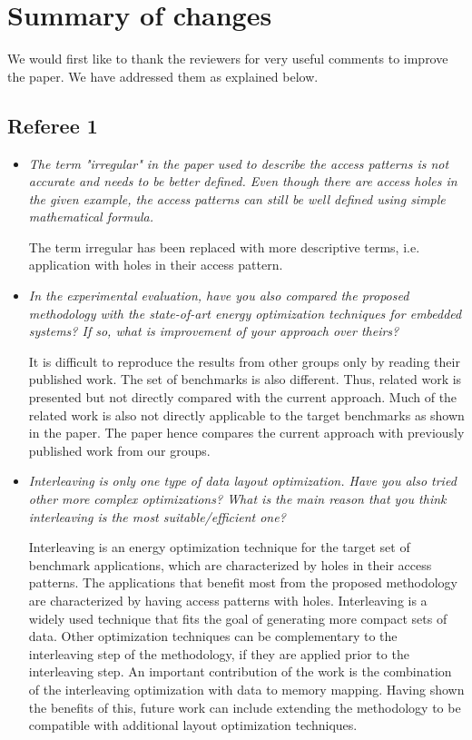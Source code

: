 \documentclass[12pt,a4paper,notitlepage]{article}
\author{Iason}
\begin{document}
\section*{Summary of changes}

We would first like to thank the reviewers for very useful comments to improve the paper. We have addressed them as explained below.

\subsection*{Referee 1}

\begin{itemize}

\item \textit{The term "irregular" in the paper used to describe the access patterns is not accurate and needs to be better defined. Even though there are access holes in the given example, the access patterns can still be well defined using simple mathematical formula.}

The term irregular has been replaced with more descriptive terms, i.e. application with holes in their access pattern.

\item \textit{In the experimental evaluation, have you also compared the proposed methodology with the state-of-art energy optimization techniques for embedded systems? If so, what is improvement of your approach over theirs?}

It is difficult to reproduce the results from other groups only by reading their published work. The set of benchmarks is also different. Thus, related work is presented but not directly compared with the current approach. Much of the related work is also not directly applicable to the target benchmarks as shown in the paper. The paper hence compares the current approach with previously published work from our groups.

\item \textit{Interleaving is only one type of data layout optimization. Have you also tried other more complex optimizations? What is the main reason that you think interleaving is the most suitable/efficient one?}

Interleaving is an energy optimization technique for the target set of benchmark applications, which are characterized by holes in their access patterns.
The applications that benefit most from the proposed methodology are characterized by having access patterns with holes.
Interleaving is a widely used technique that fits the goal of generating more compact sets of data.
Other optimization techniques can be complementary to the interleaving step of the methodology, if they are applied prior to the interleaving step.
An important contribution of the work is the combination of the interleaving optimization with data to memory mapping. Having shown the benefits of this, future work can include extending the methodology to be compatible with additional layout optimization techniques.


\end{itemize}
\end{document}
